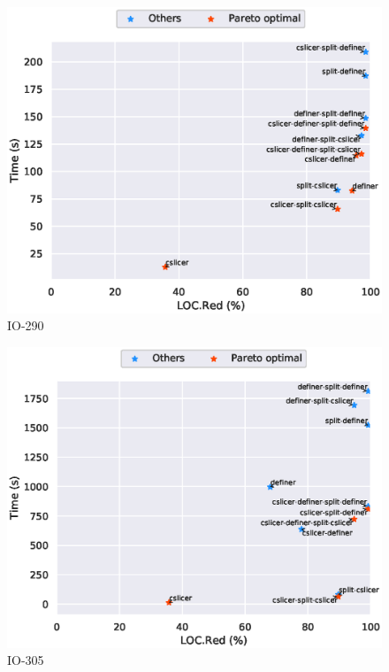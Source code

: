\begin{figure}
\includegraphics[scale=0.7]{plots/pareto/IO-290-pareto}
\caption{IO-290}
\end{figure}
\begin{figure}
\includegraphics[scale=0.7]{plots/pareto/IO-305-pareto}
\caption{IO-305}
\end{figure}
